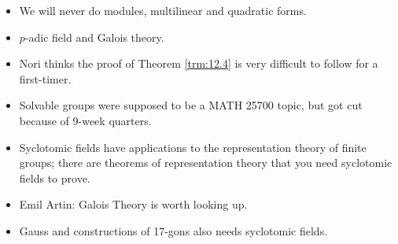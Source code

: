 \documentclass[../notes.tex]{subfiles}
\begin{document}
\begin{itemize}
\begin{itemize}
        \item We will never do modules, multilinear and quadratic forms.
        \item $p$-adic field and Galois theory.
        \item Nori thinks the proof of Theorem \ref{trm:12.4} is very difficult to follow for a first-timer.
        \item Solvable groups were supposed to be a MATH 25700 topic, but got cut because of 9-week quarters.
        \item Syclotomic fields have applications to the representation theory of finite groups; there are theorems of representation theory that you need syclotomic fields to prove.
        \item Emil Artin: Galois Theory is worth looking up.
        \item Gauss and constructions of 17-gons also needs syclotomic fields.
    \end{itemize}
\end{itemize}
\end{document}
